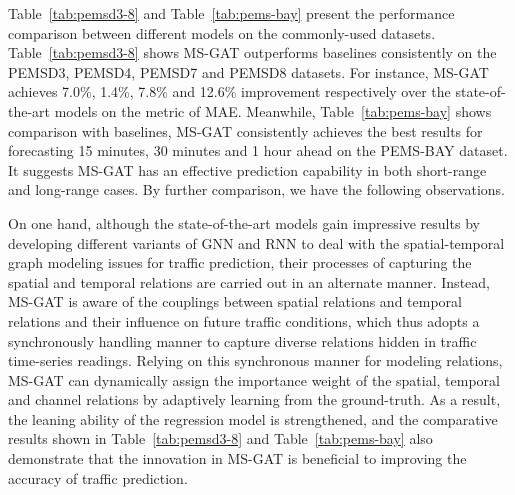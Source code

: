 Table~\ref{tab:pemsd3-8} and Table~\ref{tab:pems-bay} present the performance comparison between different models on the commonly-used datasets. Table~\ref{tab:pemsd3-8} shows MS-GAT outperforms baselines consistently on the PEMSD3, PEMSD4, PEMSD7 and PEMSD8 datasets. For instance, MS-GAT achieves 7.0\%, 1.4\%, 7.8\% and 12.6\% improvement respectively over the state-of-the-art models on the metric of MAE. Meanwhile, Table~\ref{tab:pems-bay} shows comparison with baselines, MS-GAT consistently achieves the  best results for forecasting 15 minutes, 30 minutes and 1 hour ahead on the PEMS-BAY dataset. It suggests MS-GAT has an effective prediction capability in both short-range and long-range cases. By further comparison, we have the following observations.

On one hand, although the state-of-the-art models gain impressive results by developing different variants of GNN and RNN to deal with the spatial-temporal graph modeling issues for traffic prediction,  their processes of  capturing the spatial and temporal relations are carried out in an alternate manner. Instead, MS-GAT is aware of the couplings between spatial relations and temporal relations and their influence on future traffic conditions, which thus adopts a synchronously handling manner to capture diverse relations hidden in traffic time-series readings. Relying on this synchronous manner for modeling relations, MS-GAT can dynamically assign the importance weight of the spatial, temporal  and channel relations by adaptively learning from the ground-truth. As a result, the leaning ability of the regression model is strengthened, and the comparative results shown in Table~\ref{tab:pemsd3-8} and Table~\ref{tab:pems-bay} also demonstrate that the innovation in MS-GAT is beneficial to improving the accuracy of traffic prediction.

